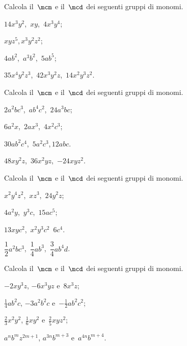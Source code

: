 \begin{esercizio}[\Ast]
 \label{ese:10.46} %
Calcola il~$\mcm$ e il~$\mcd$ dei seguenti gruppi di monomi.
\begin{multicols}{2}
\begin{enumeratea}
 \item $14x^{3}y^{2}$,\, $xy$,\, $4x^{3}y^{4}$;
 \item $xyz^{5}$,\,$x^{3}y^{2}z^{2}$;
 \item $4ab^{2}$,\, $a^{3}b^{2}$,\, $5ab^{5}$;
 \item $35x^4y^2z^3$,\, $42x^3y^2z$,\, $14x^2y^3z^2$.
\end{enumeratea}
\end{multicols}
\end{esercizio}

\begin{esercizio}
 \label{ese:10.47} %
Calcola il~$\mcm$ e il~$\mcd$ dei seguenti gruppi di monomi.
\begin{multicols}{2}
\begin{enumeratea}
 \item $2a^{2}bc^{3}$,\, $ab^{4}c^{2}$,\, $24a^{3}bc$;
 \item $6a^{2}x$,\, $2ax^{3}$,\, $4x^{2}c^{3}$;
 \item $30ab^{2}c^{4}$,\, $5a^{2}c^{3}$,\,$12abc$.
 \item $48xy^2z$,\, $36x^2yz$,\, $-24xyz^2$.
\end{enumeratea}
\end{multicols}
\end{esercizio}

\begin{esercizio}
 \label{ese:10.48} %
Calcola il~$\mcm$ e il~$\mcd$ dei seguenti gruppi di monomi.
\begin{multicols}{2}
\begin{enumeratea}
 \item $x^{2}y^{4}z^{2}$,\, $xz^{3}$,\, $24y^{2}z$;
 \item $4a^{2}y$,\, $y^{3}c$,\, $15ac^{5}$;
 \item $13xyc^{2}$,\, $x^{2}y^{3}c^{2}$\, $6c^{4}$.
 \item $\dfrac{1}{2}a^2bc^3$,\, $\dfrac{1}{4}ab^3$,\, $\dfrac{3}{4}ab^4d$.
\end{enumeratea}
\end{multicols}
\end{esercizio}

\begin{esercizio}[\Ast]
 \label{ese:10.49} %
Calcola il~$\mcm$ e il~$\mcd$ dei seguenti gruppi di monomi.

\begin{enumeratea}
 \item $-2xy^{3}z$, $-6x^{3}yz$ e~$8x^{3}z$;
 \item $\frac{1}{4}ab^{2}c$, $-3a^{2}b^{2}c$ e~$-{\frac{1}{2}}ab^{2}c^{2}$;
 \item $\frac{2}{3}x^{2}y^{2}$, $\frac{1}{6}xy^{2}$ e~$\frac{2}{5}xyz^{2}$;
 \item $a^{n}b^{m}z^{2m+1}$, $a^{3n}b^{m+3}$ e~$a^{4n}b^{m+4}$.
\end{enumeratea}
\end{esercizio}

